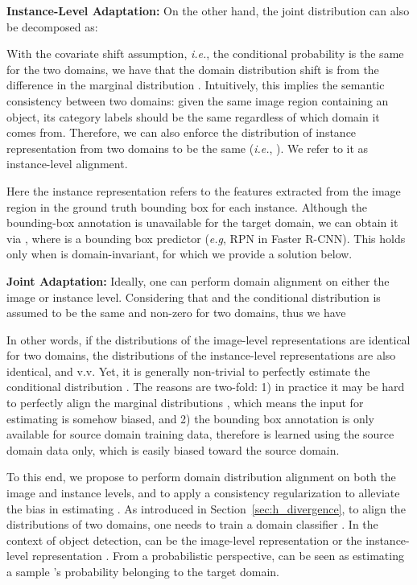 \documentclass[10pt,twocolumn,letterpaper]{article}
\def\eg{\emph{e.g}}
\def\ie{\emph{i.e.}}
\begin{document}
\textbf{Instance-Level Adaptation: } 
On the other hand, the joint distribution can also be decomposed as:

With the covariate shift assumption, \ie, the conditional probability  is the same for the two domains, we have that the domain distribution shift is from the difference in the marginal distribution . Intuitively, this implies the semantic consistency between two domains: given the same image region containing an object, its category labels should be the same regardless of which domain it comes from. Therefore, we can also enforce the distribution of instance representation from two domains to be the same (\ie, ). We refer to it as instance-level alignment. 

Here the instance representation  refers to the features extracted from the image region in the ground truth bounding box for each instance. Although the bounding-box annotation is unavailable for the target domain, we can obtain it via , where  is a bounding box predictor (\eg, RPN in Faster R-CNN). This holds only when  is domain-invariant, for which we provide a solution below. 

\textbf{Joint Adaptation: } Ideally, one can perform domain alignment on either the image or instance level. Considering that  and the conditional distribution  is assumed to be the same and non-zero for two domains, thus we have

In other words, if the distributions of the image-level representations are identical for two domains, the distributions of the instance-level representations are also identical, and v.v. Yet, it is generally non-trivial to perfectly estimate the conditional distribution . The reasons are two-fold: 1) in practice it may be hard to perfectly align the marginal distributions , which means the input for estimating  is somehow biased, and 2) the bounding box annotation is only available for source domain training data, therefore  is learned using the source domain data only, which is easily biased toward the source domain.

To this end, we propose to perform domain distribution alignment on both the image and instance levels, and to apply a consistency regularization to alleviate the bias in estimating . As introduced in Section~\ref{sec:h_divergence}, to align the distributions of two domains, one needs to train a domain classifier . In the context of object detection,  can be the image-level representation  or the instance-level representation . From a probabilistic perspective,  can be seen as estimating a sample 's probability belonging to the target domain. 
\end{document}
